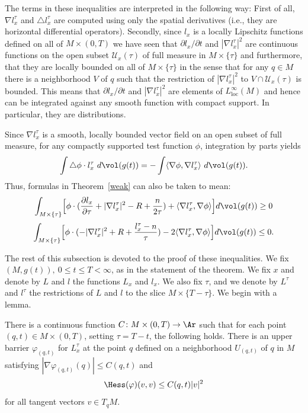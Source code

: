 \begin{remark}
\label{rem:l-weak-inequalities-interpretation}
The terms in these inequalities are interpreted in the following
way: First of all, $\nabla l^\tau_x$ and $\triangle l^\tau_x$ are
computed using only the spatial derivatives (i.e., they are
horizontal differential operators). Secondly, since $l_x$ is a
locally Lipschitz functions defined on all of $M\times (0,T)$ we
have seen that $\partial l_x/\partial t$ and $|\nabla l^\tau_x|^2$
are continuous functions on the open subset ${\mathcal U}_x(\tau)$
of full measure in $M\times\{\tau\}$ and furthermore, that they are
locally bounded on all of $M\times\{\tau\}$ in the sense that for
any $q\in M$ there is a neighborhood $V$ of $q$ such that the
restriction of $|\nabla l_x^\tau|^2$ to $V\cap {\mathcal U}_x(\tau)$
is bounded. This means that $\partial l_x/\partial t$ and $|\nabla
l_x^\tau|^2$ are elements of $L_\mathrm{loc}^\infty(M)$ and hence can
be integrated against any smooth function with compact support. In
particular, they are distributions.

 Since
$\nabla l^\tau_x$ is a smooth, locally bounded vector field on an
open subset of full measure, for any compactly supported test
function $\phi$, integration by parts yields
$$\int\triangle \phi\cdot l^\tau_x\ d\vol(g(t))=-\int \langle \nabla \phi,\nabla
l_x^\tau\rangle\ d\vol(g(t)).$$ Thus, formulas in
Theorem~\ref{weak} can also be taken to mean:
$$\int_{M\times \{\tau\}} \Bigl[\phi\cdot(\frac{\partial l_x}{\partial \tau}
+|\nabla l^\tau_x|^2-R+\frac{n}{2\tau})+ \langle \nabla
l_x^\tau,\nabla \phi \rangle\Bigr] d\vol(g(t))\ge 0$$
$$\int_{M\times\{\tau\}} \Bigl[\phi\cdot(-|\nabla
l^\tau_x|^2+R+\frac{l^\tau_x-n}{\tau})-2\langle\nabla
l^\tau_x,\nabla\phi \rangle\Bigr] d\vol(g(t))\le 0.$$
\end{remark}

The rest of this subsection is devoted to the proof of these
inequalities. We fix $(M,g(t)),\ 0\le t\le T<\infty$, as in the
statement of the theorem.
 We
fix $x$ and denote by $L$ and $l$ the functions $L_{x}$ and $l_{x}$.
We also fix $\tau$, and we denote by $L^\tau$ and $l^\tau$ the
restrictions of $L$ and $l$ to the slice $M\times \{T-\tau\}$. We
begin with a lemma.

\begin{lemma}
\label{lem:l-barrier-hessian-bound}
\label{phisupport}
There is a continuous function $C\colon M\times (0,T)\to \Ar$ such
that for each point $(q,t)\in M\times (0,T)$, setting $\tau=T-t$,
the following holds. There is an upper barrier $\varphi_{(q,t)}$ for
$L_x^\tau$ at the point $q$ defined on a neighborhood $U_{(q,t)}$ of
$q$ in $M$ satisfying $|\nabla \varphi_{(q,t)}(q)|\le C(q,t)$ and
$$\Hess(\varphi)(v,v)\le C(q,t)|v|^2$$
for all tangent vectors $v\in T_qM$.
\end{lemma}

